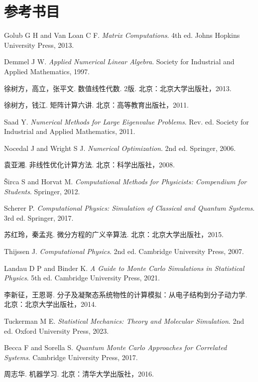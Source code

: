 \chapter*{参考书目}
\small
\begin{enumerate}[label={[\arabic*]},leftmargin=3em,itemsep=0.45em]
\item Golub G H and Van Loan C F. \emph{Matrix Computations}. 4th ed. Johns Hopkins University Press, 2013.
\item Demmel J W. \emph{Applied Numerical Linear Algebra}. Society for Industrial and Applied Mathematics, 1997.
\item 徐树方，高立，张平文. 数值线性代数. 2版. 北京：北京大学出版社，2013.
\item 徐树方，钱江. 矩阵计算六讲. 北京：高等教育出版社，2011.
\item Saad Y. \emph{Numerical Methods for Large Eigenvalue Problems}. Rev. ed. Society for Industrial and Applied Mathematics, 2011.
\item Nocedal J and Wright S J. \emph{Numerical Optimization}. 2nd ed. Springer, 2006.
\item 袁亚湘. 非线性优化计算方法. 北京：科学出版社，2008.
\item Širca S and Horvat M. \emph{Computational Methods for Physicists: Compendium for Students}. Springer, 2012.
\item Scherer P. \emph{Computational Physics: Simulation of Classical and Quantum Systems}. 3rd ed. Springer, 2017.
\item 苏红玲，秦孟兆. 微分方程的广义辛算法. 北京：北京大学出版社，2015.
\item Thijssen J. \emph{Computational Physics}. 2nd ed. Cambridge University Press, 2007.
\item Landau D P and Binder K. \emph{A Guide to Monte Carlo Simulations in Statistical Physics}. 5th ed. Cambridge University Press, 2021.
\item 李新征，王恩哥. 分子及凝聚态系统物性的计算模拟：从电子结构到分子动力学. 北京：北京大学出版社，2014.
\item Tuckerman M E. \emph{Statistical Mechanics: Theory and Molecular Simulation}. 2nd ed. Oxford University Press, 2023.
\item Becca F and Sorella S. \emph{Quantum Monte Carlo Approaches for Correlated Systems}. Cambridge University Press, 2017.
\item 周志华. 机器学习. 北京：清华大学出版社，2016.
\end{enumerate}
\normalsize
